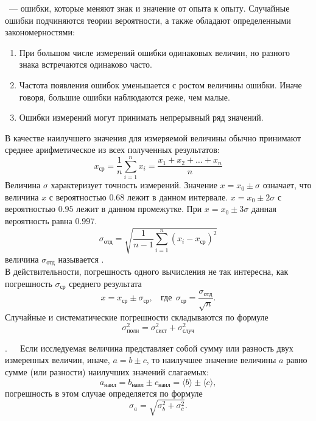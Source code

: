 ~--- ошибки, которые меняют знак и значение от опыта к опыту. Случайные ошибки подчиняются теории вероятности, а также обладают определенными закономерностями:
\begin{enumerate}
\item
{При большом числе измерений ошибки одинаковых величин, но разного знака встречаются одинаково часто.}
\item
{Частота появления ошибок уменьшается с ростом величины ошибки. Иначе говоря, большие ошибки наблюдаются реже, чем малые.}
\item
{Ошибки измерений могут принимать непрерывный ряд значений.}
\end{enumerate}
В качестве наилучшего значения для измеряемой величины обычно принимают среднее арифметическое из всех полученных результатов:
\begin{equation}
x_\text{ср} = \frac{1}{n}\sum\limits_{i=1}^n x_i = \frac{x_1 + x_2+\ldots + x_n}{n}
\end{equation}
Величина $\sigma$ характеризует точность измерений. Значение $x = x_0 \pm \sigma$ означает, что величина $x$ с вероятностью $0.68$ лежит в данном интервале. $x = x_0 \pm 2\sigma$ с вероятностью $0.95$ лежит в данном промежутке. При $x=x_0 \pm 3\sigma$ данная вероятность равна $0.997$.
\begin{equation}
\sigma_\text{отд} = \sqrt{\frac{1}{n-1}\sum\limits_{i=1}^n (x_i - x_\text{ср})^2}
\end{equation}
величина $\sigma_\text{отд}$ называется .\\
В действительности, погрешность одного вычисления не так интересна, как погрешность $\sigma_\text{ср}$ среднего результата
\begin{equation}
x = x_\text{ср} \pm \sigma_\text{ср},~~~~\text{где}~~\sigma_\text{ср} = \frac{\sigma_\text{отд}}{\sqrt{n}}.
\end{equation}
Случайные и систематические погрешности складываются по формуле
\begin{equation}
\sigma_\text{полн}^2 = \sigma_\text{сист}^2 + \sigma_\text{случ}^2
\end{equation}

.~~~Если исследуемая величина представляет собой сумму или разность двух измеренных величин, иначе, $a = b \pm c$, то наилучшее значение величины $a$ равно сумме (или разности) наилучших значений слагаемых:
\begin{equation}
a_\text{наил} = b_\text{наил} \pm c_\text{наил} = \langle b \rangle \pm \langle c \rangle,
\end{equation}
погрешность в этом случае определяется по формуле
\begin{equation}
\sigma_a = \sqrt{\sigma_b^2 + \sigma_c^2}.
\end{equation}

